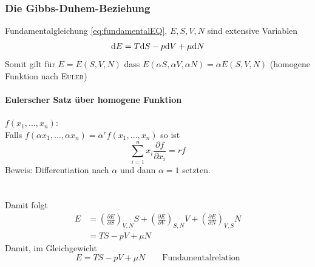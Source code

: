\subsubsection{Die Gibbs-Duhem-Beziehung}
Fundamentalgleichung \eqref{eq:fundamentalEQ}, $E, S, V, N$ sind extensive Variablen
\begin{equation}
  \mathrm{d} E = T \mathrm{d} S - p \mathrm{d} V + \mu \mathrm{d} N
\end{equation}
Somit gilt für $E=E(S, V, N)$ dass $E(\alpha S, \alpha V, \alpha N) = \alpha E(S, V, N)$ (homogene Funktion nach \textsc{Euler})
\paragraph{Eulerscher Satz über homogene Funktion} $f(x_1, \ldots, x_n)$: \\
Falls $f(\alpha x_1, \ldots, \alpha x_n) = \alpha^r f(x_1, \ldots, x_n)$ so ist
\begin{equation}
  \sum_{i=1}^{n} x_i \frac{\partial f}{\partial x_i} = r f
\end{equation}
Beweis: Differentiation nach $\alpha$ und dann $\alpha = 1$ setzten. 
\paragraph{}\mbox{}\\
Damit folgt 
\begin{equation}
\begin{split}
  E &= \left( \frac{\partial E}{\partial S} \right)_{V, N} S + \left( \frac{\partial E}{\partial V} \right)_{S, N} V + \left( \frac{\partial E}{\partial N} \right)_{V, S} N \\ 
  &= T S - p V + \mu N
\end{split}
\end{equation}
Damit, im Gleichgewicht
\begin{equation}
  E = T S - p V + \mu N \qquad \text{Fundamentalrelation}
\end{equation}